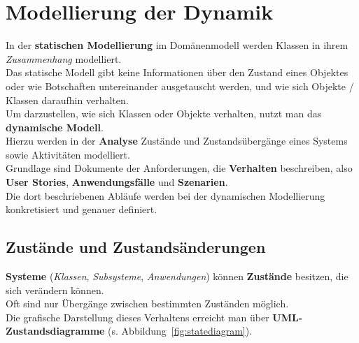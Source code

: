 \section{Modellierung der Dynamik}

\noindent
In der \textbf{statischen Modellierung} im Domänenmodell werden Klassen in ihrem \textit{Zusammenhang} modelliert.\\

\noindent
Das statische Modell gibt keine Informationen über den Zustand eines Objektes oder wie Botschaften untereinander ausgetauscht werden, und wie sich Objekte / Klassen daraufhin verhalten.\\

\noindent
Um darzustellen, wie sich Klassen oder Objekte verhalten, nutzt man das \textbf{dynamische Modell}.\\

\noindent
Hierzu werden in der \textbf{Analyse} Zustände und Zustandsübergänge eines Systems sowie Aktivitäten modelliert.\\
Grundlage sind Dokumente der Anforderungen, die \textbf{Verhalten} beschreiben, also \textbf{User Stories}, \textbf{Anwendungsfälle} und \textbf{Szenarien}.\\
Die dort beschriebenen Abläufe werden bei der dynamischen Modellierung konkretisiert und genauer definiert.

\subsection*{Zustände und Zustandsänderungen}
\textbf{Systeme} (\textit{Klassen}, \textit{Subsysteme}, \textit{Anwendungen}) können \textbf{Zustände} besitzen, die sich verändern können.\\

\noindent
Oft sind nur Übergänge zwischen bestimmten Zuständen möglich.\\

\noindent
Die grafische Darstellung dieses Verhaltens erreicht man über \textbf{UML-Zustandsdiagramme} (s. Abbildung~\ref{fig:statediagram}).

